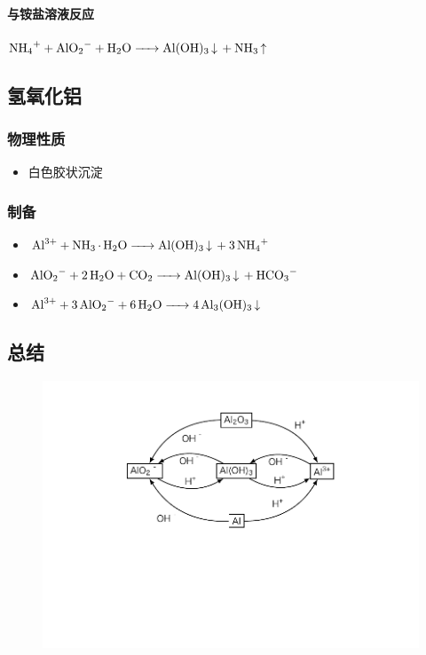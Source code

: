 \documentclass[a4paper]{article}
\begin{document}
	\paragraph{与铵盐溶液反应}
	$\ce{NH4+ + AlO2- + H2O -> Al(OH)3 v + NH3 ^}\\$
	
	\subsection{氢氧化铝}
	\subsubsection{物理性质}
	\begin{itemize}
		\item 白色胶状沉淀
	\end{itemize}
	\subsubsection{制备}
	\begin{itemize}
		\item $\ce{Al^3+ + NH3*H2O -> Al(OH)3 v + 3NH4+}\\$
		\item $\ce{AlO2- + 2H2O + CO2 -> Al(OH)3 v + HCO3-}\\$
		\item $\ce{Al^3+ + 3AlO2- + 6H2O -> 4Al3(OH)3 v}\\$
	\end{itemize}
	
	\subsection{总结}
	\begin{figure}[h]
	\centering
	\includegraphics[scale=0.8]{res/Al.pdf}
	\end{figure}
	
\end{document}
